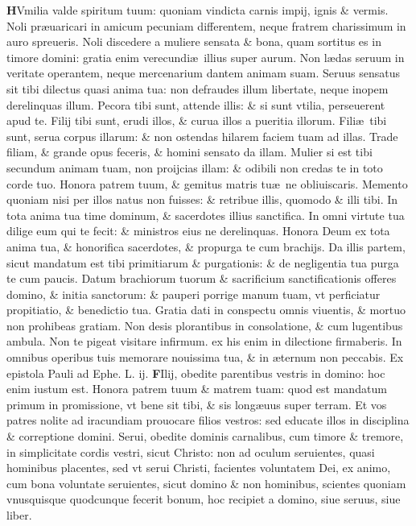 \documentclass[a5paper,10pt]{book}
\def\leftmarginnote{%
	\lrmarginnote{\hskip -\marginparsep \hskip -6.5em}}
\def\rightmarginnote{%
	\lrmarginnote{\hskip\columnwidth \hskip -1em}}
\def\ae{æ}
\begin{document}
\begin{multicols*}{2}
\vspace{-1.25em}
\lettrine[lines=2]{\bfseries H}{}Vmilia\rightmarginnote{ca. 7.} valde spiritum tuum: quoniam vindicta carnis impij, ignis \& vermis.
Noli pr\ae uaricari in amicum pecuniam differentem, neque fratrem charissimum in auro spreueris.
Noli discedere a muliere sensata \& bona, quam sortitus es in timore domini: gratia enim verecundi\ae \ illius super aurum.
Non l\ae das seruum in veritate operantem, neque mercenarium dantem animam suam. Seruus sensatus sit tibi dilectus quasi anima tua: non defraudes illum libertate, neque inopem derelinquas illum.
Pecora tibi sunt, attende illis: \& si sunt vtilia, perseuerent apud te. Filij tibi sunt, erudi illos, \& curua illos a pueritia illorum.
Fili\ae \ tibi sunt, serua corpus illarum: \& non ostendas hilarem faciem tuam ad illas. Trade filiam, \& grande opus feceris, \& homini sensato da illam.
Mulier si est tibi secundum animam tuam, non proijcias illam: \& odibili non credas te in toto corde tuo. Honora patrem tuum, \& gemitus matris tu\ae \ ne obliuiscaris.
Memento quoniam nisi per illos natus non fuisses: \& retribue illis, quomodo \& illi tibi.
In tota anima tua time dominum, \& sacerdotes illius sanctifica. In omni virtute tua dilige eum qui te fecit: \& ministros eius ne derelinquas.
Honora Deum ex tota anima tua, \& honorifica sacerdotes, \& propurga te cum brachijs. Da illis partem, sicut mandatum est tibi primitiarum \& purgationis: \&
de negligentia tua purga te cum paucis.
Datum brachiorum tuorum \& sacrificium sanctificationis offeres domino, \& initia sanctorum: \& pauperi porrige manum tuam, vt perficiatur propitiatio, \& benedictio tua.
Gratia dati in conspectu omnis viuentis, \& mortuo non prohibeas gratiam. Non desis plorantibus in consolatione, \& cum lugentibus ambula.
Non te pigeat visitare infirmum. ex his enim in dilectione firmaberis. In omnibus operibus tuis memorare nouissima tua, \& in \ae ternum non peccabis.
\newline {} \color{red} Ex epistola Pauli ad Ephe. \hfill L. ij. \color{black}
\vspace{-1.25em}
\lettrine[lines=2]{\bfseries \color{red} F}{}Ilij,\leftmarginnote{\begin{flushright}ca. 6.\end{flushright}} obedite parentibus vestris in domino: hoc enim iustum est.
Honora patrem tuum \& matrem tuam: quod est mandatum primum in promissione, vt bene sit tibi, \& sis long\ae uus super terram.
Et vos patres nolite ad iracundiam prouocare filios vestros: sed educate illos in disciplina \& correptione domini. Serui, obedite dominis carnalibus, cum timore \& tremore, in simplicitate cordis vestri, sicut Christo: non ad oculum seruientes, quasi hominibus placentes, sed vt serui Christi, facientes voluntatem Dei, ex animo, cum bona voluntate seruientes, sicut domino \& non hominibus, scientes quoniam vnusquisque quodcunque fecerit bonum, hoc recipiet a domino, siue seruus, siue liber.

\end{multicols*}
\end{document}

